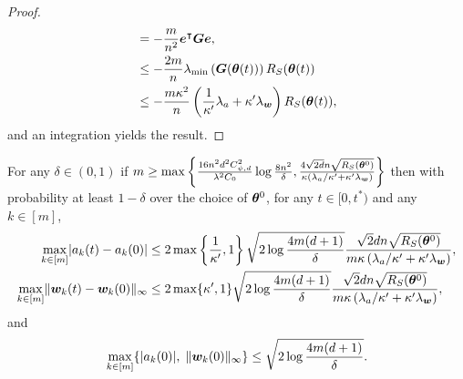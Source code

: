\documentclass{article}
\begin{document}
\begin{proof}
\begin{equation}
\begin{aligned}
             & =-\frac{m}{n^2}\bm{e}^{\intercal}\bm{G}\bm{e},                                                                                                                                                  \\
             & \leq -\frac{2m}{n}\lambda_{\min}\left(\bm{G}(\bm{\theta}(t))\right)R_S(\bm{\theta}(t))                                                                                                     \\
             & \leq -\frac{m\kappa^2}{n}\left(\frac{1}{\kappa'}\lambda_a+\kappa'\lambda_{\bm{w}}\right)R_S(\bm{\theta}(t)),
        \end{aligned}
    \end{equation}
    and an integration yields the result.
\end{proof}

\begin{prop}\label{prop:a_w}
    For any $\delta\in(0,1)$ if $m\geq\max\left\{\frac{16n^2d^2C_{\psi,d}^2}{\lambda^2C_0}\log\frac{8n^2}{\delta}, \frac{4\sqrt{2d}n\sqrt{R_S(\bm{\theta}^0)}}{\kappa\left(\lambda_a/\kappa'+\kappa'\lambda_{\bm{w}}\right)}\right\}$ then with probability at least $1-\delta$ over the choice of $\bm{\theta}^0$, for any $t\in[0, t^\ast)$ and any $k\in [m]$,
    \begin{equation}
        \begin{aligned}
            \max\limits_{k\in[m]}\lvert a_k(t) - a_k(0)\rvert
             & \leq 2\max\left\{\frac{1}{\kappa'},1\right\}\sqrt{2\log\frac{4m(d+1)}{\delta}}\frac{\sqrt{2}dn\sqrt{R_S(\bm{\theta}^0)}}{m\kappa\left(\lambda_a/\kappa'+\kappa'\lambda_{\bm{w}}\right)}, \\
            \max\limits_{k\in[m]}\lVert\bm{w}_k(t) - \bm{w}_k(0)\rVert_{\infty}
             & \leq 2\max\{
            \kappa',1\}\sqrt{2\log\frac{4m(d+1)}{\delta}}\frac{\sqrt{2}dn\sqrt{R_S(\bm{\theta}^0)}}{m\kappa\left(\lambda_a/\kappa'+\kappa'\lambda_{\bm{w}}\right)},
        \end{aligned}
    \end{equation}
    and
    \begin{equation}
        \max\limits_{k\in[m]}\{\lvert a_k(0)\rvert,\;\lVert\bm{w}_k(0)\rVert_{\infty}\} \leq \sqrt{2\log\frac{4m(d+1)}{\delta}}.
    \end{equation}
\end{prop}
\end{document}
